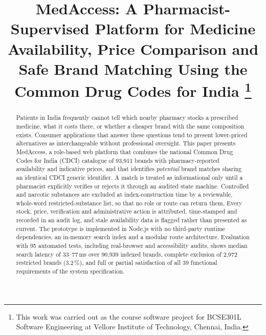 \documentclass[conference]{IEEEtran}
\begin{document}
\title{MedAccess: A Pharmacist-Supervised Platform for Medicine Availability, Price Comparison and Safe Brand Matching Using the Common Drug Codes for India%
\thanks{This work was carried out as the course software project for BCSE301L Software Engineering at Vellore Institute of Technology, Chennai, India.}}

\author{
\and
{}
\and
{}
\and
{}
}

\maketitle

\begin{abstract}
Patients in India frequently cannot tell which nearby pharmacy stocks a prescribed medicine, what it costs there, or whether a cheaper brand with the same composition exists. Consumer applications that answer these questions tend to present lower-priced alternatives as interchangeable without professional oversight. This paper presents MedAccess, a role-based web platform that combines the national Common Drug Codes for India (CDCI) catalogue of 93{,}911 brands with pharmacy-reported availability and indicative prices, and that identifies \emph{potential} brand matches sharing an identical CDCI generic identifier. A match is treated as informational only until a pharmacist explicitly verifies or rejects it through an audited state machine. Controlled and narcotic substances are excluded at index-construction time by a reviewable, whole-word restricted-substance list, so that no role or route can return them. Every stock, price, verification and administrative action is attributed, time-stamped and recorded in an audit log, and stale availability data is flagged rather than presented as current. The prototype is implemented in Node.js with no third-party runtime dependencies, an in-memory search index and a modular route architecture. Evaluation with 95 automated tests, including real-browser and accessibility audits, shows median search latency of 33--77\,ms over 90{,}939 indexed brands, complete exclusion of 2{,}972 restricted brands (3.2\,\%), and full or partial satisfaction of all 39 functional requirements of the system specification.
\end{abstract}
\end{document}
